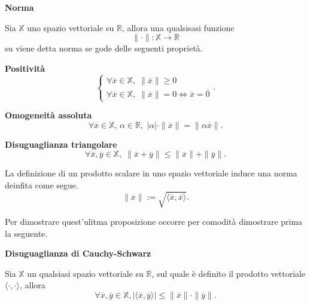 \begin{definition}
    \textbf{Norma}

    Sia $\mathbb{X}$ uno spazio vettoriale su $\mathbb{R}$, allora una qualsisasi funzione
    \[\| \cdot \|: \mathbb{X}\rightarrow\mathbb{R}\] su
    viene detta norma se gode delle seguenti proprietà.
    \begin{property}
        \textbf{Positività}
        \[
            \begin{cases}
                \forall\overline{x}\in\mathbb{X},\;
                \|\overline{x}\| \geq 0\\
                \forall\overline{x}\in\mathbb{X},\;
                \|\overline{x}\| = 0 \Leftrightarrow
                \overline{x}=\overline{0}
            \end{cases}.
        \]
    \end{property}
    \begin{property}
        \textbf{Omogeneità assoluta}
        \[
            \forall\overline{x}\in\mathbb{X},\, \alpha\in\mathbb{R},\;
            \left|\alpha\right|\cdot\|\overline{x}\| = \|\alpha \overline{x}\|.
        \]
    \end{property}
    \begin{property}
        \textbf{Disuguaglianza triangolare}
        \[
            \forall\overline{x},\overline{y}\in\mathbb{X},\;
            \|\overline{x}+\overline{y}\| \leq
            \|\overline{x}\| + \|\overline{y}\|.
        \]
    \end{property}
\end{definition}

\begin{proposition}\label{pro:induzione-norma}
    La definizione di un prodotto scalare in uno spazio
    vettoriale induce una norma deinfita come segue.
    \[
        \| \overline{x} \| := \sqrt{\langle \overline{x}, \overline{x} \rangle}.
    \]
\end{proposition}
Per dimostrare quest'ulitma proposizione occorre per comodità dimostrare prima la seguente.

\begin{theorem}\label{pro:cauchy-schwarz}
    \textbf{Disuguaglianza di Cauchy-Schwarz}

    Sia $\mathbb{X}$ un qualsiasi spazio vettoriale su $\mathbb{R}$, sul quale è definito il prodotto
    vettoriale $\langle \cdot, \cdot \rangle$, allora
    \[
        \forall \overline{x}, \overline{y}\in\mathbb{X},
        \left|\langle \overline{x}, \overline{y} \rangle\right| \leq
        \|\overline{x}\|\cdot\|\overline{y}\|.
    \]
\end{theorem}



